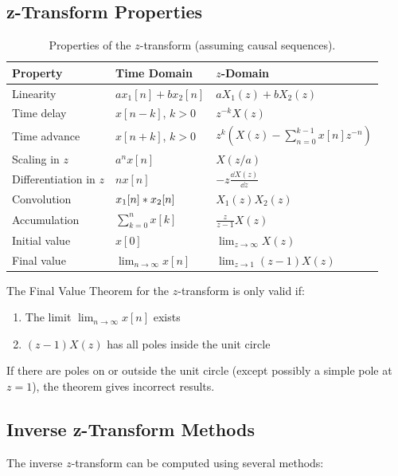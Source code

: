 \subsection{z-Transform Properties}

\begin{table}[htbp]
\centering
\begin{tabular}{lll}
\toprule
\textbf{Property} & \textbf{Time Domain} & \textbf{$z$-Domain} \\
\midrule
Linearity & $ax_1[n] + bx_2[n]$ & $aX_1(z) + bX_2(z)$ \\
Time delay & $x[n-k]$, $k > 0$ & $z^{-k}X(z)$ \\
Time advance & $x[n+k]$, $k > 0$ & $z^{k}\left(X(z) - \sum_{n=0}^{k-1}x[n]z^{-n}\right)$ \\
Scaling in $z$ & $a^n x[n]$ & $X(z/a)$ \\
Differentiation in $z$ & $nx[n]$ & $-z\frac{\dd X(z)}{\dd z}$ \\
Convolution & $x_1[n] \ast x_2[n]$ & $X_1(z)X_2(z)$ \\
Accumulation & $\sum_{k=0}^{n} x[k]$ & $\frac{z}{z-1}X(z)$ \\
Initial value & $x[0]$ & $\lim_{z\to\infty} X(z)$ \\
Final value & $\lim_{n\to\infty} x[n]$ & $\lim_{z\to 1}(z-1)X(z)$ \\
\bottomrule
\end{tabular}
\caption{Properties of the $z$-transform (assuming causal sequences).}
\label{tab:z_properties}
\end{table}

\begin{warningbox}[title=Final Value Theorem Conditions]
The Final Value Theorem for the $z$-transform is only valid if:
\begin{enumerate}
    \item The limit $\lim_{n\to\infty} x[n]$ exists
    \item $(z-1)X(z)$ has all poles inside the unit circle
\end{enumerate}
If there are poles on or outside the unit circle (except possibly a simple pole at $z=1$), the theorem gives incorrect results.
\end{warningbox}

\subsection{Inverse z-Transform Methods}

The inverse $z$-transform can be computed using several methods:


